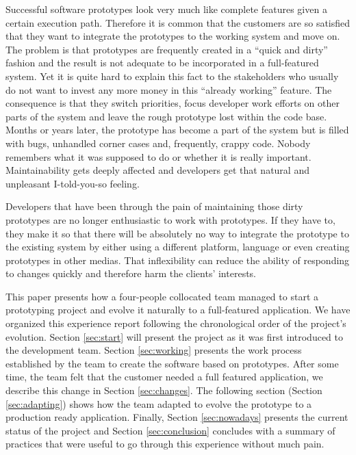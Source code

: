 \documentclass[lnbip]{svmultln}
\begin{document}
Successful software prototypes look very much like complete features
given a certain execution path. Therefore it is common that the
customers are so satisfied that they want to integrate the prototypes
to the working system and move on. The problem is that prototypes are
frequently created in a ``quick and dirty'' fashion and the result is
not adequate to be incorporated in a full-featured system. Yet it is
quite hard to explain this fact to the stakeholders who usually do not
want to invest any more money in this ``already working'' feature. The
consequence is that they switch priorities, focus developer work
efforts on other parts of the system and leave the rough prototype
lost within the code base. Months or years later, the prototype has
become a part of the system but is filled with bugs, unhandled corner
cases and, frequently, crappy code. Nobody remembers what it was
supposed to do or whether it is really important. Maintainability gets
deeply affected and developers get that natural and unpleasant
I-told-you-so feeling. %

Developers that have been through the pain of maintaining those dirty
prototypes are no longer enthusiastic to work with prototypes. If they
have to, they make it so that there will be absolutely no way to
integrate the prototype to the existing system by either using a
different platform, language or even creating prototypes in other
medias. That inflexibility can reduce the ability of responding to
changes quickly and therefore harm the clients' interests.

This paper presents how a four-people collocated team managed to start
a prototyping project and evolve it naturally to a full-featured
application.  We have organized this experience report following the
chronological order of the project's evolution. Section
\ref{sec:start} will present the project as it was first introduced to
the development team. Section \ref{sec:working} presents the work
process established by the team to create the software based on
prototypes. After some time, the team felt that the customer needed a
full featured application, we describe this change in Section
\ref{sec:changes}. The following section (Section \ref{sec:adapting})
shows how the team adapted to evolve the prototype to a
production ready application. Finally, Section \ref{sec:nowadays}
presents the current status of the project and Section
\ref{sec:conclusion} concludes with a summary of practices that were
useful to go through this experience without much pain.
\end{document}
